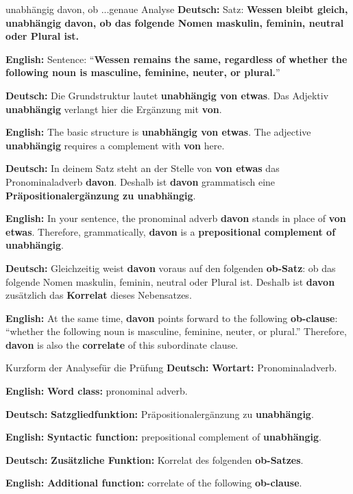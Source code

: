 \documentclass[a4paper,11pt]{article}
\newcommand{\GermanText}[1]{\textbf{Deutsch: }#1\par}
\newcommand{\EnglishText}[1]{{\small\color{SoftGray}\textbf{English: }#1\par}}
\begin{document}
        \begin{grammarentry}{unabhängig davon, ob ...}{genaue Analyse}
            \GermanText{Satz: \glqq \textbf{Wessen bleibt gleich, unabhängig davon, ob das folgende Nomen maskulin, feminin, neutral oder Plural ist.}\grqq}
            \EnglishText{Sentence: ``\textbf{Wessen remains the same, regardless of whether the following noun is masculine, feminine, neuter, or plural.}''}

            \GermanText{Die Grundstruktur lautet \textbf{unabhängig von etwas}. Das Adjektiv \textbf{unabhängig} verlangt hier die Ergänzung mit \textbf{von}.}
            \EnglishText{The basic structure is \textbf{unabhängig von etwas}. The adjective \textbf{unabhängig} requires a complement with \textbf{von} here.}

            \GermanText{In deinem Satz steht an der Stelle von \textbf{von etwas} das Pronominaladverb \textbf{davon}. Deshalb ist \textbf{davon} grammatisch eine \textbf{Präpositionalergänzung zu unabhängig}.}
            \EnglishText{In your sentence, the pronominal adverb \textbf{davon} stands in place of \textbf{von etwas}. Therefore, grammatically, \textbf{davon} is a \textbf{prepositional complement of unabhängig}.}

            \GermanText{Gleichzeitig weist \textbf{davon} voraus auf den folgenden \textbf{ob-Satz}: \glqq ob das folgende Nomen maskulin, feminin, neutral oder Plural ist\grqq. Deshalb ist \textbf{davon} zusätzlich das \textbf{Korrelat} dieses Nebensatzes.}
            \EnglishText{At the same time, \textbf{davon} points forward to the following \textbf{ob-clause}: ``whether the following noun is masculine, feminine, neuter, or plural.'' Therefore, \textbf{davon} is also the \textbf{correlate} of this subordinate clause.}
        \end{grammarentry}

        \begin{grammarentry}{Kurzform der Analyse}{für die Prüfung}
            \GermanText{\textbf{Wortart:} Pronominaladverb.}
            \EnglishText{\textbf{Word class:} pronominal adverb.}

            \GermanText{\textbf{Satzgliedfunktion:} Präpositionalergänzung zu \textbf{unabhängig}.}
            \EnglishText{\textbf{Syntactic function:} prepositional complement of \textbf{unabhängig}.}

            \GermanText{\textbf{Zusätzliche Funktion:} Korrelat des folgenden \textbf{ob-Satzes}.}
            \EnglishText{\textbf{Additional function:} correlate of the following \textbf{ob-clause}.}
        \end{grammarentry}
\end{document}
